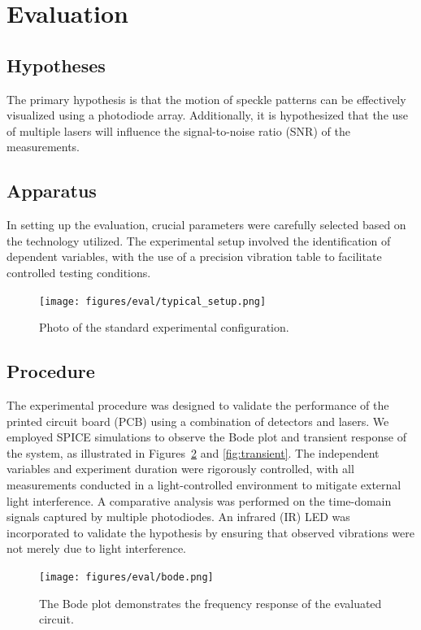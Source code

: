 \section{Evaluation}
\label{sec:evaluation}

\subsection{Hypotheses}
The primary hypothesis is that the motion of speckle patterns can be effectively visualized using a photodiode array. Additionally, it is hypothesized that the use of multiple lasers will influence the signal-to-noise ratio (SNR) of the measurements.

\subsection{Apparatus}
In setting up the evaluation, crucial parameters were carefully selected based on the technology utilized. 
The experimental setup involved the identification of dependent variables, with the use of a precision vibration table to facilitate controlled testing conditions.

\begin{figure}[t]
    \centering
    \texttt{[image: figures/eval/typical\_setup.png]}
    \caption{Photo of the standard experimental configuration.}
    \label{fig:setup}
\end{figure}

\subsection{Procedure}
The experimental procedure was designed to validate the performance of the printed circuit board (PCB) using a combination of detectors and lasers. 
We employed SPICE simulations to observe the Bode plot and transient response of the system, as illustrated in Figures~\ref{fig:bodeplot} and \ref{fig:transient}. 
The independent variables and experiment duration were rigorously controlled, with all measurements conducted in a light-controlled environment to mitigate external light interference. 
A comparative analysis was performed on the time-domain signals captured by multiple photodiodes. 
An infrared (IR) LED was incorporated to validate the hypothesis by ensuring that observed vibrations were not merely due to light interference.

\begin{figure}[t]
    \centering
    \texttt{[image: figures/eval/bode.png]}
    \caption{The Bode plot demonstrates the frequency response of the evaluated circuit.}
    \label{fig:bodeplot}
\end{figure}

